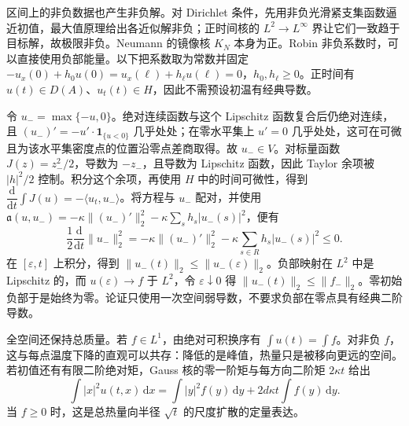 \ProseParagraphBreak

区间上的非负数据也产生非负解。对 Dirichlet 条件，先用非负光滑紧支集函数逼近初值，最大值原理给出各近似解非负；正时间核的 \(L^2\to L^\infty\) 界让它们一致趋于目标解，故极限非负。Neumann 的镜像核 \(K_N\) 本身为正。Robin 非负系数时，可以直接使用负部能量。以下把系数取为常数并固定 \(-u_x(0)+h_0u(0)=u_x(\ell)+h_\ell u(\ell)=0\)，\(h_0,h_\ell\geq0\)。正时间有 \(u(t)\in D(A)\)、\(u_t(t)\in H\)，因此不需预设初温有经典导数。

\ProseParagraphBreak

令 \(u_-=\max\{-u,0\}\)。绝对连续函数与这个 Lipschitz 函数复合后仍绝对连续，且 \((u_-)'=-u'\cdot\mathbf1_{\{u<0\}}\) 几乎处处；在零水平集上 \(u'=0\) 几乎处处，这可在可微且为该水平集密度点的位置沿零点差商取得。故 \(u_-\in V\)。对标量函数 \(J(z)=z_-^2/2\)，导数为 \(-z_-\)，且导数为 Lipschitz 函数，因此 Taylor 余项被 \(|h|^2/2\) 控制。积分这个余项，再使用 \(H\) 中的时间可微性，得到 \(\dfrac{\mathrm{d}}{\mathrm{d}t}\int J(u)=-\langle u_t,u_-\rangle\)。将方程与 \(u_-\) 配对，并使用 \(\mathfrak a(u,u_-)=-\kappa\|(u_-)'\|_2^2-\kappa\sum_s h_s|u_-(s)|^2\)，便有
\[
 \dfrac12\dfrac{\mathrm{d}}{\mathrm{d}t}\|u_-\|_2^2
 =-\kappa\|(u_-)'\|_2^2
 -\kappa\sum_{s\in R}h_s|u_-(s)|^2\leq0.
\]
在 \([\varepsilon,t]\) 上积分，得到 \(\|u_-(t)\|_2\leq\|u_-(\varepsilon)\|_2\)。负部映射在 \(L^2\) 中是 Lipschitz 的，而 \(u(\varepsilon)\to f\) 于 \(L^2\)，令 \(\varepsilon\downarrow0\) 得 \(\|u_-(t)\|_2\leq\|f_-\|_2\)。零初始负部于是始终为零。论证只使用一次空间弱导数，不要求负部在零点具有经典二阶导数。

\ProseParagraphBreak

全空间还保持总质量。若 \(f\in L^1\)，由绝对可积换序有 \(\int u(t)=\int f\)。对非负 \(f\)，这与每点温度下降的直观可以共存：降低的是峰值，热量只是被移向更远的空间。若初值还有有限二阶绝对矩，Gauss 核的零一阶矩与每方向二阶矩 \(2\kappa t\) 给出
\[
 \int|x|^2u(t,x)\,\mathrm{d}x
 =\int|y|^2f(y)\,\mathrm{d}y+2d\kappa t\int f(y)\,\mathrm{d}y.
\]
当 \(f\geq0\) 时，这是总热量向半径 \(\sqrt t\) 的尺度扩散的定量表达。
